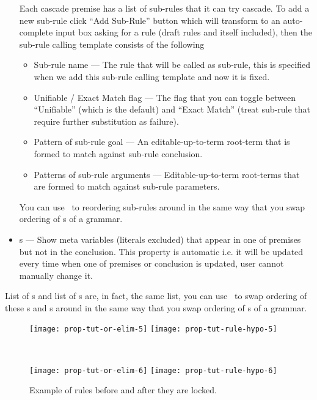 \documentclass[master.tex]{subfiles}
\begin{document}
\begin{itemize}
  Each cascade premise has a list of sub-rules that it can try cascade. To add a
  new sub-rule click ``Add Sub-Rule'' button which will transform to an
  auto-complete input box asking for a rule (draft rules and itself included),
  then the sub-rule calling template consists of the following
  \begin{itemize}
  \item Sub-rule name --- The rule that will be called as sub-rule, this is
    specified when we add this sub-rule calling template and now it is fixed.
  \item Unifiable / Exact Match flag --- The flag that you can
    toggle between ``Unifiable''  (which is the default)  and ``Exact Match''
    (treat sub-rule that require further substitution as failure).
  \item Pattern of sub-rule goal --- An editable-up-to-term root-term that is
    formed to match against sub-rule conclusion.
  \item Patterns of sub-rule arguments --- Editable-up-to-term root-terms that
    are formed to match against sub-rule parameters.
  \end{itemize}
  You can use \swapButton\ to reordering sub-rules around in the same way that
  you swap ordering of \kChoice{}s of a grammar.

\item \kParameter{}s --- Show meta variables (literals excluded) that appear
  in one of premises but not in the conclusion. This property is automatic i.e.
  it will be updated every time when one of premises or conclusion is updated,
  user cannot manually change it.
\end{itemize}

List of \kPremise{}s and list of \kCascade{}s are, in fact, the same list, you
can use \swapButton\ to swap ordering of these \kPremise{}s and \kCascade{}s
around in the same way that you swap ordering of \kChoice{}s of a grammar.

\begin{figure}[H]
    \centering

\begin{minipage}{0.48\textwidth}
\begin{flushleft}
    \texttt{[image: prop-tut-or-elim-5]}
    \texttt{[image: prop-tut-rule-hypo-5]}
\end{flushleft}
\end{minipage}
~
\begin{minipage}{0.48\textwidth}
\begin{flushright}
    \texttt{[image: prop-tut-or-elim-6]}
    \texttt{[image: prop-tut-rule-hypo-6]}
\end{flushright}
\end{minipage}
\caption{Example of rules before and after they are locked.}
\end{figure}
\end{document}
